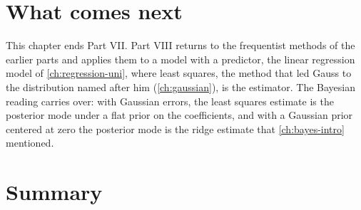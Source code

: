 \section{What comes next}
\label{sec:jeff-next}

This chapter ends Part VII.
Part VIII returns to the frequentist methods of the earlier parts and applies them to a model with a predictor, the linear regression model of \cref{ch:regression-uni}, where least squares, the method that led Gauss to the distribution named after him (\cref{ch:gaussian}), is the estimator.
The Bayesian reading carries over: with Gaussian errors, the least squares estimate is the posterior mode under a flat prior on the coefficients, and with a Gaussian prior centered at zero the posterior mode is the ridge estimate that \cref{ch:bayes-intro} mentioned.

\section{Summary}
\label{sec:jeff-summary}

